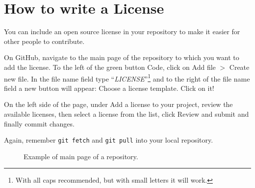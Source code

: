 \section{How to write a License}

You can include an open source license in your repository to make it easier for other people to contribute.

On \textsf{GitHub}, navigate to the main page of the repository to which you want to add the license. To the left of the green button \textsf{Code}, click on \textsf{Add file} $>$ \textsf{Create new file}. In the file name field type ``\textit{LICENSE}''\footnote{With all caps recommended, but with small letters it will work.} and to the right of the file name field a new button will appear: \textsf{Choose a license template}. Click on it!

On the left side of the page, under \textsf{Add a license to your project}, review the available licenses, then select a license from the list, click \textsf{Review and submit} and finally commit changes.

Again, remember \texttt{git fetch} and \texttt{git pull} into your local repository.

\begin{figure} %
    \centering
    \caption{Example of main page of a repository.}
    \label{fig:Fork}
\end{figure}

